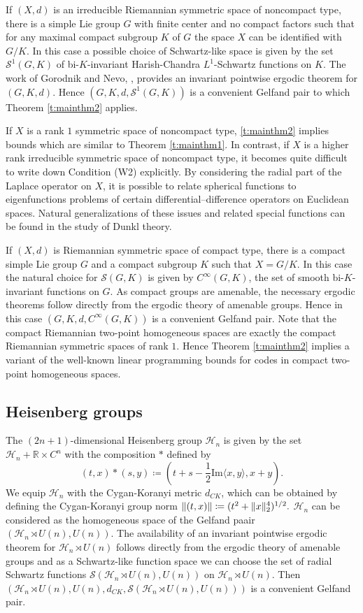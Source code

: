 \documentclass[12pt,reqno,a4paper]{amsart}
\theoremstyle{theorem}
\theoremstyle{definition}
\numberwithin{theorem}{section}
\numberwithin{equation}{section}
\newcommand{\R}{\mathbb{R}}
\DeclarePairedDelimiter{\norm}{\lVert}{\rVert}
\begin{document}
If $(X,d)$ is an irreducible Riemannian symmetric space of noncompact type, there is a simple Lie group $G$ with finite center and no compact factors such that for any maximal compact subgroup $K$ of $G$ the space $X$ can be identified with $G/K$.
In this case a possible choice of Schwartz-like space is given by the set $\mathscr{S}^1(G,K)$ of bi-$K$-invariant Harish-Chandra $L^1$-Schwartz functions on $K$. 
The work of Gorodnik and Nevo, \cite{GorodnikNevo}, provides an invariant pointwise ergodic theorem for $(G, K, d)$. Hence $(G, K, d, \mathscr{S}^1(G,K))$ is a convenient Gelfand pair to which Theorem \ref{t:mainthm2} applies.

If $X$ is a rank $1$ symmetric space of noncompact type, \ref{t:mainthm2} implies bounds which are similar to Theorem \ref{t:mainthm1}.
In contrast, if $X$ is a higher rank irreducible symmetric space of noncompact type, it becomes quite difficult to write down Condition (W2) explicitly. By considering the radial part of the Laplace operator on $X$, it is possible to relate spherical functions to eigenfunctions problems of certain differential–difference operators on Euclidean spaces. Natural generalizations of these issues and related special functions can be found in the study of Dunkl theory. 

If $(X,d)$ is Riemannian symmetric space of compact type, there is a compact simple Lie group $G$ and a compact subgroup $K$ such that $X=G/K$. In this case the natural choice for $\mathcal{S}(G, K)$ is given by $C^\infty(G, K)$, the set of smooth bi-$K$-invariant functions on $G$. As compact groups are amenable, the necessary ergodic theorems follow directly from the ergodic theory of amenable groups. Hence in this case $(G, K, d, C^\infty(G, K))$ is a convenient Gelfand pair. Note that the compact Riemannian two-point homogeneous spaces are exactly the compact Riemannian symmetric spaces of rank $1$. Hence Theorem \ref{t:mainthm2} implies a variant of the well-known linear programming bounds for codes in compact two-point homogeneous spaces.

\subsection{Heisenberg groups}
	The $(2n+1)$-dimensional Heisenberg group $\mathcal{H}_n$ is given by the set $\mathcal{H}_n+\R\times C^n$ with the composition $\ast$ defined by
	\[
	(t,x)\ast (s, y)\coloneqq (t+s -\frac{1}{2}\mathrm{Im}\langle x,y \rangle,x+y).
	\]
	We equip $\mathcal{H}_n$ with the Cygan-Koranyi metric $d_{CK}$, which can be obtained by defining the Cygan-Koranyi group norm
	$\norm{(t,x)}\coloneqq (t^2+\norm{x}_2^4)^{1/2}.$
	$\mathcal{H}_n$ can be considered as the homogeneous space of the Gelfand paair $(\mathcal{H}_n\rtimes U(n), U(n))$.
	The availability of an invariant pointwise ergodic theorem for $\mathcal{H}_n\rtimes U(n)$ follows directly from the ergodic theory of amenable groups and as a Schwartz-like function space we can choose the set of radial Schwartz functions $\mathscr{S}(\mathcal{H}_n\rtimes U(n), U(n))$ on $\mathcal{H}_n\rtimes U(n)$. Then $(\mathcal{H}_n\rtimes U(n), U(n), d_{CK}, \mathscr{S}(\mathcal{H}_n\rtimes U(n), U(n)))$ is a convenient Gelfand pair.
	
\end{document}
